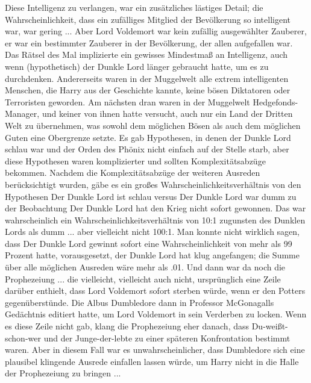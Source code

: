 Diese Intelligenz zu verlangen, war ein zusätzliches lästiges Detail; die
Wahrscheinlichkeit, dass ein zufälliges Mitglied der Bevölkerung so intelligent
war, war gering ... Aber Lord Voldemort war kein zufällig ausgewählter Zauberer,
er war ein bestimmter Zauberer in der Bevölkerung, der allen aufgefallen war.
Das Rätsel des Mal implizierte ein gewisses Mindestmaß an Intelligenz, auch wenn
(hypothetisch) der Dunkle Lord länger gebraucht hatte, um es zu durchdenken.
Andererseits waren in der Muggelwelt alle extrem intelligenten Menschen, die
Harry aus der Geschichte kannte, keine bösen Diktatoren oder Terroristen
geworden. Am nächsten dran waren in der Muggelwelt Hedgefonds-Manager, und
keiner von ihnen hatte versucht, auch nur ein Land der Dritten Welt zu
übernehmen, was sowohl dem möglichen Bösen als auch dem möglichen Guten eine
Obergrenze setzte. Es gab Hypothesen, in denen der Dunkle Lord schlau war und
der Orden des Phönix nicht einfach auf der Stelle starb, aber diese Hypothesen
waren komplizierter und sollten Komplexitätsabzüge bekommen. Nachdem die
Komplexitätsabzüge der weiteren Ausreden berücksichtigt wurden, gäbe es ein
großes Wahrscheinlichkeitsverhältnis von den Hypothesen \glqq{}Der Dunkle Lord
ist schlau\grqq{} versus \glqq{}Der Dunkle Lord war dumm\grqq{} zu der
Beobachtung \glqq{}Der Dunkle Lord hat den Krieg nicht sofort gewonnen\grqq{}.
Das war wahrscheinlich ein Wahrscheinlichkeitsverhältnis von 10:1 zugunsten des
Dunklen Lords als dumm ... aber vielleicht nicht 100:1. Man konnte nicht wirklich
sagen, dass \glqq{}Der Dunkle Lord gewinnt sofort\grqq{} eine Wahrscheinlichkeit
von mehr als 99 Prozent hatte, vorausgesetzt, der Dunkle Lord hat klug
angefangen; die Summe über alle möglichen Ausreden wäre mehr als .01. Und dann
war da noch die Prophezeiung ... die vielleicht, vielleicht auch nicht,
ursprünglich eine Zeile darüber enthielt, dass Lord Voldemort sofort sterben
würde, wenn er den Potters gegenüberstünde. Die Albus Dumbledore dann in
Professor McGonagalls Gedächtnis editiert hatte, um Lord Voldemort in sein
Verderben zu locken. Wenn es diese Zeile nicht gab, klang die Prophezeiung eher
danach, dass Du-weißt-schon-wer und der Junge-der-lebte zu einer späteren
Konfrontation bestimmt waren. Aber in diesem Fall war es unwahrscheinlicher,
dass Dumbledore sich eine plausibel klingende Ausrede einfallen lassen würde, um
Harry nicht in die Halle der Prophezeiung zu bringen ...

